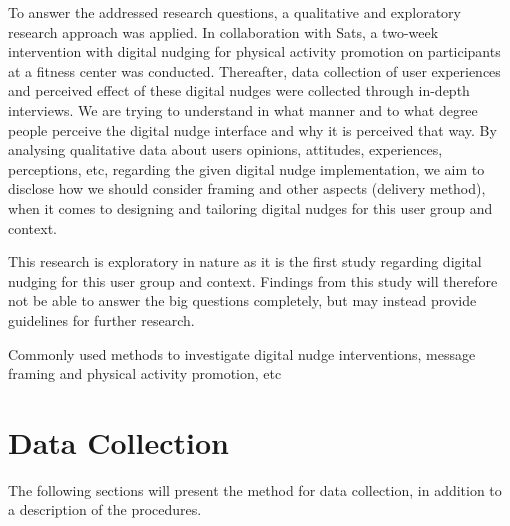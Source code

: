 To answer the addressed research questions, a qualitative and exploratory research approach was applied. In collaboration with Sats, a two-week intervention with digital nudging for physical activity promotion on participants at a fitness center was conducted. Thereafter, data collection of user experiences and perceived effect of these digital nudges were collected through in-depth interviews. We are trying to understand in what manner and to what degree people perceive the digital nudge interface and why it is perceived that way. By analysing qualitative data about users opinions, attitudes, experiences, perceptions, etc, regarding the given digital nudge implementation, we aim to disclose how we should consider framing and other aspects (delivery method), when it comes to designing and tailoring digital nudges for this user group and context. 


This research is exploratory in nature as it is the first study regarding digital nudging for this user group and context. Findings from this study will therefore not be able to answer the big questions completely, but may instead provide guidelines for further research. 

Commonly used methods to investigate digital nudge interventions, message framing and physical activity promotion, etc 

\section{Data Collection}
The following sections will present the method for data collection, in addition to a description of the procedures. 
